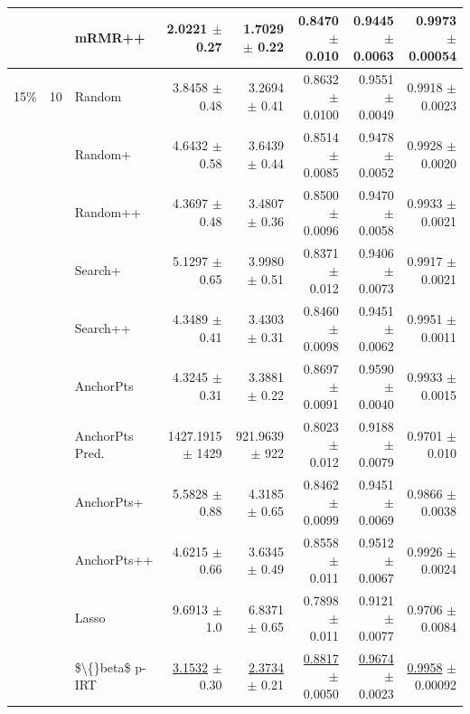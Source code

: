 \begin{longtable}{llp{}rrrrr}
 &  & mRMR++ & 2.0221 {\scriptsize $\pm$ 0.27} & 1.7029 {\scriptsize $\pm$ 0.22} & 0.8470 {\scriptsize $\pm$ 0.010} & 0.9445 {\scriptsize $\pm$ 0.0063} & 0.9973 {\scriptsize $\pm$ 0.00054} \\
\midrule
15\% & 10 & Random & 3.8458 {\scriptsize $\pm$ 0.48} & 3.2694 {\scriptsize $\pm$ 0.41} & 0.8632 {\scriptsize $\pm$ 0.0100} & 0.9551 {\scriptsize $\pm$ 0.0049} & 0.9918 {\scriptsize $\pm$ 0.0023} \\
 &  & Random+ & 4.6432 {\scriptsize $\pm$ 0.58} & 3.6439 {\scriptsize $\pm$ 0.44} & 0.8514 {\scriptsize $\pm$ 0.0085} & 0.9478 {\scriptsize $\pm$ 0.0052} & 0.9928 {\scriptsize $\pm$ 0.0020} \\
 &  & Random++ & 4.3697 {\scriptsize $\pm$ 0.48} & 3.4807 {\scriptsize $\pm$ 0.36} & 0.8500 {\scriptsize $\pm$ 0.0096} & 0.9470 {\scriptsize $\pm$ 0.0058} & 0.9933 {\scriptsize $\pm$ 0.0021} \\
 &  & Search+ & 5.1297 {\scriptsize $\pm$ 0.65} & 3.9980 {\scriptsize $\pm$ 0.51} & 0.8371 {\scriptsize $\pm$ 0.012} & 0.9406 {\scriptsize $\pm$ 0.0073} & 0.9917 {\scriptsize $\pm$ 0.0021} \\
 &  & Search++ & 4.3489 {\scriptsize $\pm$ 0.41} & 3.4303 {\scriptsize $\pm$ 0.31} & 0.8460 {\scriptsize $\pm$ 0.0098} & 0.9451 {\scriptsize $\pm$ 0.0062} & 0.9951 {\scriptsize $\pm$ 0.0011} \\
 &  & AnchorPts & 4.3245 {\scriptsize $\pm$ 0.31} & 3.3881 {\scriptsize $\pm$ 0.22} & 0.8697 {\scriptsize $\pm$ 0.0091} & 0.9590 {\scriptsize $\pm$ 0.0040} & 0.9933 {\scriptsize $\pm$ 0.0015} \\
 &  & AnchorPts Pred. & 1427.1915 {\scriptsize $\pm$ 1429} & 921.9639 {\scriptsize $\pm$ 922} & 0.8023 {\scriptsize $\pm$ 0.012} & 0.9188 {\scriptsize $\pm$ 0.0079} & 0.9701 {\scriptsize $\pm$ 0.010} \\
 &  & AnchorPts+ & 5.5828 {\scriptsize $\pm$ 0.88} & 4.3185 {\scriptsize $\pm$ 0.65} & 0.8462 {\scriptsize $\pm$ 0.0099} & 0.9451 {\scriptsize $\pm$ 0.0069} & 0.9866 {\scriptsize $\pm$ 0.0038} \\
 &  & AnchorPts++ & 4.6215 {\scriptsize $\pm$ 0.66} & 3.6345 {\scriptsize $\pm$ 0.49} & 0.8558 {\scriptsize $\pm$ 0.011} & 0.9512 {\scriptsize $\pm$ 0.0067} & 0.9926 {\scriptsize $\pm$ 0.0024} \\
 &  & Lasso & 9.6913 {\scriptsize $\pm$ 1.0} & 6.8371 {\scriptsize $\pm$ 0.65} & 0.7898 {\scriptsize $\pm$ 0.011} & 0.9121 {\scriptsize $\pm$ 0.0077} & 0.9706 {\scriptsize $\pm$ 0.0084} \\
 &  & \$\textbackslash\{\}beta\$ p-IRT & \underline{3.1532} {\scriptsize $\pm$ 0.30} & \underline{2.3734} {\scriptsize $\pm$ 0.21} & \underline{0.8817} {\scriptsize $\pm$ 0.0050} & \underline{0.9674} {\scriptsize $\pm$ 0.0023} & \underline{0.9958} {\scriptsize $\pm$ 0.00092} \\

\end{longtable}
